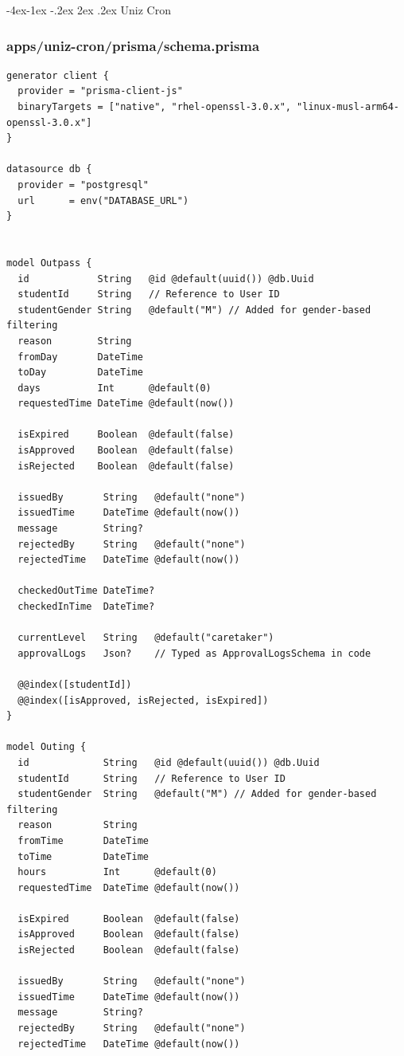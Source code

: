 \documentclass[11pt,a4paper,oneside]{article}
\makeatletter
\renewcommand{\subsection}{\@startsection{subsection}{2}{\z@}%
    {-4ex\@plus -1ex \@minus -.2ex}%
    {2ex \@plus .2ex}%
    {\normalfont\Large\bfseries\color{accent}}}
\makeatother
\begin{document}
\subsection{Uniz Cron}
\subsubsection*{apps/uniz-cron/prisma/schema.prisma}
\begin{lstlisting}
generator client {
  provider = "prisma-client-js"
  binaryTargets = ["native", "rhel-openssl-3.0.x", "linux-musl-arm64-openssl-3.0.x"]
}

datasource db {
  provider = "postgresql"
  url      = env("DATABASE_URL")
}


model Outpass {
  id            String   @id @default(uuid()) @db.Uuid
  studentId     String   // Reference to User ID
  studentGender String   @default("M") // Added for gender-based filtering
  reason        String
  fromDay       DateTime
  toDay         DateTime
  days          Int      @default(0)
  requestedTime DateTime @default(now())
  
  isExpired     Boolean  @default(false)
  isApproved    Boolean  @default(false)
  isRejected    Boolean  @default(false)
  
  issuedBy       String   @default("none")
  issuedTime     DateTime @default(now())
  message        String?
  rejectedBy     String   @default("none")
  rejectedTime   DateTime @default(now())
  
  checkedOutTime DateTime?
  checkedInTime  DateTime?
  
  currentLevel   String   @default("caretaker")
  approvalLogs   Json?    // Typed as ApprovalLogsSchema in code

  @@index([studentId])
  @@index([isApproved, isRejected, isExpired])
}

model Outing {
  id             String   @id @default(uuid()) @db.Uuid
  studentId      String   // Reference to User ID
  studentGender  String   @default("M") // Added for gender-based filtering
  reason         String
  fromTime       DateTime
  toTime         DateTime
  hours          Int      @default(0)
  requestedTime  DateTime @default(now())
  
  isExpired      Boolean  @default(false)
  isApproved     Boolean  @default(false)
  isRejected     Boolean  @default(false)
  
  issuedBy       String   @default("none")
  issuedTime     DateTime @default(now())
  message        String?
  rejectedBy     String   @default("none")
  rejectedTime   DateTime @default(now())
  

\end{lstlisting}
\end{document}
